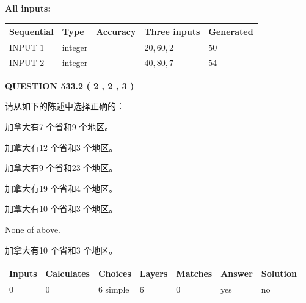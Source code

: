 \documentclass{ctexart}
\begin{document}
   
   
   
\noindent\vspace{0.1in}\hspace{-0.08in} {\textbf{\Large{All inputs: }}}
   
   
  
  
\noindent\begin{tabular}{|l|l|l|l|l|}
\hline
 Sequential & Type & Accuracy & Three inputs & Generated \\ 
\hline
 
 
  INPUT $  1 $ & integer &  & $
 20
 , 
 60
 , 
 2
 $ & $ 50 $ 
 \\  \hline  
 
 
  INPUT $  2 $ & integer &  & $
 40
 , 
 80
 , 
 7
 $ & $ 54 $ 
 \\  \hline  
 \end{tabular}
   
   
  
\vspace{0.2in}
  
{\textbf{\Large{QUESTION
533.2 
 ( 2 , 2 , 3 )
}}}
  
  
请从如下的陈述中选择正确的：
 
 
加拿大有7 个省和9 个地区。
 
 
加拿大有12 个省和3 个地区。
 
 
加拿大有9 个省和23 个地区。
 
 
加拿大有19 个省和4 个地区。
 
 
加拿大有10 个省和3 个地区。
 
 
 None of above.
 
 
\noindent{}
 
 
加拿大有10 个省和3 个地区。
 
 
\noindent{}
 
 
   
   
   
   
\noindent\begin{tabular}{|l|l|l|l|l|l|l|}
 \hline
Inputs & Calculates & Choices & Layers & Matches & Answer & Solution \\ \hline
 0  & 
 0  & 
 6
  simple  
  & 
 6  & 
 0  & 
  yes & 
  no 
  \\ \hline
 \end{tabular}
   
\end{document}
